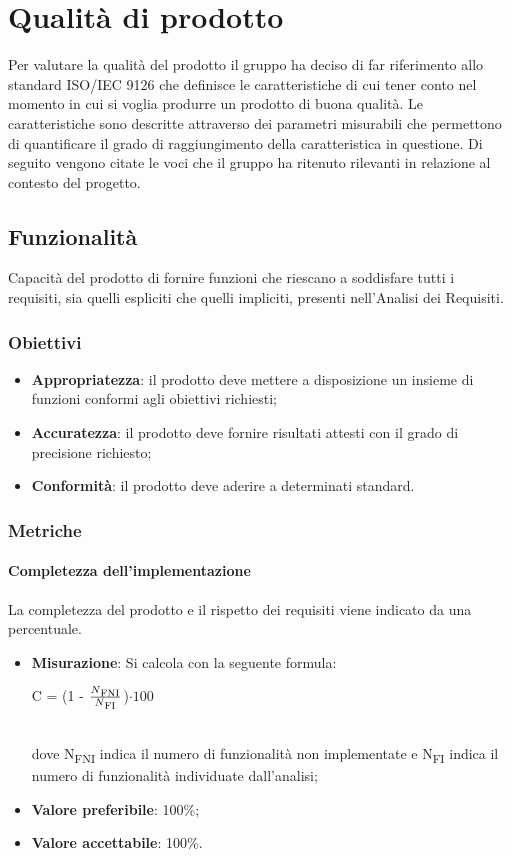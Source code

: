 \section{Qualità di prodotto}
Per valutare la qualità del prodotto il gruppo ha deciso di far riferimento allo standard ISO/IEC 9126\glosp{} che definisce le caratteristiche di cui tener conto nel momento in cui si voglia produrre un prodotto di buona qualità. Le caratteristiche sono descritte attraverso dei parametri misurabili che permettono di quantificare il grado di raggiungimento della caratteristica in questione. Di seguito vengono citate le voci che il gruppo ha ritenuto rilevanti in relazione al contesto del progetto.
	\subsection{Funzionalità}
	Capacità del prodotto di fornire funzioni che riescano a soddisfare tutti i requisiti, sia quelli espliciti che quelli impliciti, presenti nell'Analisi dei Requisiti.
		\subsubsection{Obiettivi}
		\begin{itemize}
			\item \textbf{Appropriatezza}: il prodotto deve mettere a disposizione un insieme di funzioni conformi agli obiettivi richiesti;
			\item \textbf{Accuratezza}: il prodotto deve fornire risultati attesti con il grado di precisione richiesto;
			\item \textbf{Conformità}: il prodotto deve aderire a determinati standard. %
		\end{itemize}
		\subsubsection{Metriche}
			\paragraph{Completezza dell'implementazione}
			La completezza del prodotto e il rispetto dei requisiti viene indicato da una percentuale.
			\begin{itemize}
			\item \textbf{Misurazione}: Si calcola con la seguente formula: \\
			\centerline { C = (1 - \(\frac{N\textsubscript{FNI}}{N\textsubscript{FI}} \))$ \cdot  100$ } \\
			dove N\textsubscript{FNI} indica il numero di funzionalità non implementate e N\textsubscript{FI} indica il numero di funzionalità individuate dall'analisi;
			\item \textbf{Valore preferibile}: 100\%;
			\item \textbf{Valore accettabile}: 100\%.
			\end{itemize}
